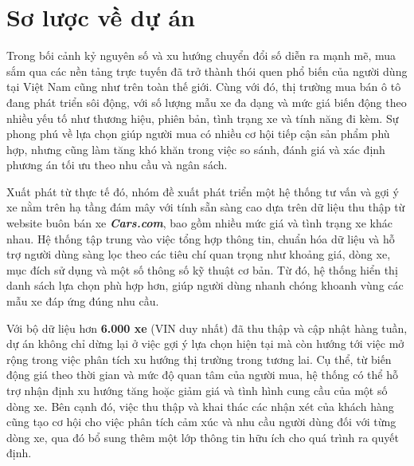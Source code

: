 \setlength{\parskip}{2pt}
\linespread{1}

\section{Sơ lược về dự án}

Trong bối cảnh kỷ nguyên số và xu hướng chuyển đổi số diễn ra mạnh mẽ, mua sắm qua các nền tảng trực tuyến đã trở thành thói quen phổ biến của người dùng tại Việt Nam cũng như trên toàn thế giới. Cùng với đó, thị trường mua bán ô tô đang phát triển sôi động, với số lượng mẫu xe đa dạng và mức giá biến động theo nhiều yếu tố như thương hiệu, phiên bản, tình trạng xe và tính năng đi kèm. Sự phong phú về lựa chọn giúp người mua có nhiều cơ hội tiếp cận sản phẩm phù hợp, nhưng cũng làm tăng khó khăn trong việc so sánh, đánh giá và xác định phương án tối ưu theo nhu cầu và ngân sách.

Xuất phát từ thực tế đó, nhóm đề xuất phát triển một hệ thống tư vấn và gợi ý xe nằm trên hạ tầng đám mây với tính sẵn sàng cao dựa trên dữ liệu thu thập từ website buôn bán xe \textbf{\textit{Cars.com}}, bao gồm nhiều mức giá và tình trạng xe khác nhau. Hệ thống tập trung vào việc tổng hợp thông tin, chuẩn hóa dữ liệu và hỗ trợ người dùng sàng lọc theo các tiêu chí quan trọng như khoảng giá, dòng xe, mục đích sử dụng và một số thông số kỹ thuật cơ bản. Từ đó, hệ thống hiển thị danh sách lựa chọn phù hợp hơn, giúp người dùng nhanh chóng khoanh vùng các mẫu xe đáp ứng đúng nhu cầu.

Với bộ dữ liệu hơn \textbf{6.000 xe} (VIN duy nhất) đã thu thập và cập nhật hàng tuần, dự án không chỉ dừng lại ở việc gợi ý lựa chọn hiện tại mà còn hướng tới việc mở rộng trong việc phân tích xu hướng thị trường trong tương lai. Cụ thể, từ biến động giá theo thời gian và mức độ quan tâm của người mua, hệ thống có thể hỗ trợ nhận định xu hướng tăng hoặc giảm giá và tình hình cung cầu của một số dòng xe. Bên cạnh đó, việc thu thập và khai thác các nhận xét của khách hàng cũng tạo cơ hội cho việc phân tích cảm xúc và nhu cầu người dùng đối với từng dòng xe, qua đó bổ sung thêm một lớp thông tin hữu ích cho quá trình ra quyết định.

